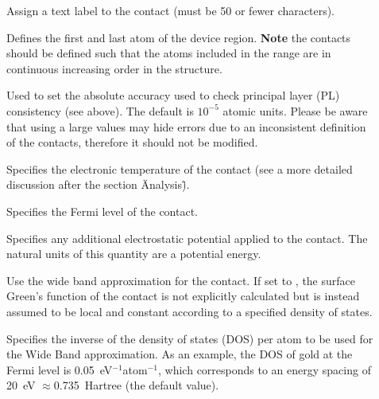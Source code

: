 \begin{description}
\item[] Assign a text label to the contact (must be 50 or fewer
  characters).
\item[]  Defines the first and last atom of the
  device region.  {\bf Note} the contacts should be defined such that the atoms
  included in the range are in continuous increasing order in the structure.
\item[] Used to set the absolute
  accuracy used to check principal layer (PL) consistency (see above). The
  default is $10^{-5}$ atomic units. Please be aware that using a large values
  may hide errors due to an inconsistent definition of the contacts, therefore
  it should not be modified.
\item[] Specifies the electronic
  temperature of the contact (see a more detailed discussion after the section 
  \"Analysis\").
\item[] Specifies the Fermi level of the
  contact.
\item[] Specifies any additional
  electrostatic potential applied to the contact. The natural units of this
  quantity are a potential energy.
\item[] Use the wide band approximation for the contact. If set to
  , the surface Green's function of the contact is not explicitly
  calculated but is instead assumed to be local and constant according to a
  specified density of states.
\item[] Specifies the inverse of the
  density of states (DOS) per atom to be used for the Wide Band
  approximation. As an example, the DOS of gold at the Fermi level is
  0.05~eV$^{-1}$atom$^{-1}$, which corresponds to an energy spacing of 20~eV
  $\approx$0.735~Hartree (the default value).
\end{description}

